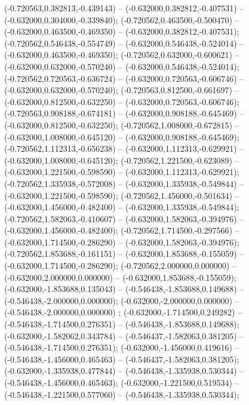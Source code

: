  (-0.720563,0.382813,-0.439143) -- (-0.632000,0.382812,-0.407531) -- (-0.632000,0.304000,-0.339840);
 (-0.720562,0.463500,-0.500470) -- (-0.632000,0.463500,-0.469350) -- (-0.632000,0.382812,-0.407531);
 (-0.720562,0.546438,-0.554749) -- (-0.632000,0.546438,-0.524014) -- (-0.632000,0.463500,-0.469350);
 (-0.720562,0.632000,-0.600621) -- (-0.632000,0.632000,-0.570240) -- (-0.632000,0.546438,-0.524014);
 (-0.720562,0.720563,-0.636724) -- (-0.632000,0.720563,-0.606746) -- (-0.632000,0.632000,-0.570240);
 (-0.720563,0.812500,-0.661697) -- (-0.632000,0.812500,-0.632250) -- (-0.632000,0.720563,-0.606746);
 (-0.720563,0.908188,-0.674181) -- (-0.632000,0.908188,-0.645469) -- (-0.632000,0.812500,-0.632250);
 (-0.720562,1.008000,-0.672815) -- (-0.632000,1.008000,-0.645120) -- (-0.632000,0.908188,-0.645469);
 (-0.720562,1.112313,-0.656238) -- (-0.632000,1.112313,-0.629921) -- (-0.632000,1.008000,-0.645120);
 (-0.720562,1.221500,-0.623089) -- (-0.632000,1.221500,-0.598590) -- (-0.632000,1.112313,-0.629921);
 (-0.720562,1.335938,-0.572008) -- (-0.632000,1.335938,-0.549844) -- (-0.632000,1.221500,-0.598590);
 (-0.720562,1.456000,-0.501634) -- (-0.632000,1.456000,-0.482400) -- (-0.632000,1.335938,-0.549844);
 (-0.720562,1.582063,-0.410607) -- (-0.632000,1.582063,-0.394976) -- (-0.632000,1.456000,-0.482400);
 (-0.720562,1.714500,-0.297566) -- (-0.632000,1.714500,-0.286290) -- (-0.632000,1.582063,-0.394976);
 (-0.720562,1.853688,-0.161151) -- (-0.632000,1.853688,-0.155059) -- (-0.632000,1.714500,-0.286290);
 (-0.720562,2.000000,0.000000) -- (-0.632000,2.000000,0.000000) -- (-0.632000,1.853688,-0.155059);
 (-0.632000,-1.853688,0.135043) -- (-0.546438,-1.853688,0.149688) -- (-0.546438,-2.000000,0.000000);
 (-0.632000,-2.000000,0.000000) -- (-0.546438,-2.000000,0.000000) ;
 (-0.632000,-1.714500,0.249282) -- (-0.546438,-1.714500,0.276351) -- (-0.546438,-1.853688,0.149688);
 (-0.632000,-1.582062,0.343784) -- (-0.546437,-1.582063,0.381205) -- (-0.546438,-1.714500,0.276351);
 (-0.632000,-1.456000,0.419616) -- (-0.546438,-1.456000,0.465463) -- (-0.546437,-1.582063,0.381205);
 (-0.632000,-1.335938,0.477844) -- (-0.546438,-1.335938,0.530344) -- (-0.546438,-1.456000,0.465463);
 (-0.632000,-1.221500,0.519534) -- (-0.546438,-1.221500,0.577060) -- (-0.546438,-1.335938,0.530344);
